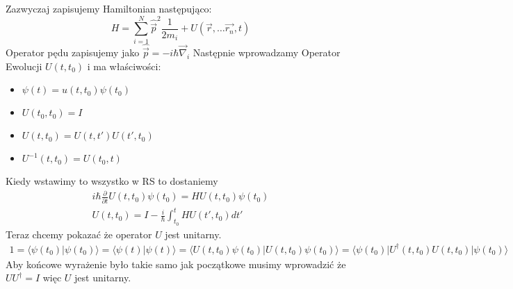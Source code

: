 Zazwyczaj zapisujemy Hamiltonian następująco:
$$  H=\sum_{i=1}^{N} \hat{\overrightarrow{p}}^{2} \frac{1}{2 m_{i}} + U\left(\vec{r}, \ldots \overrightarrow{r_{n}}, t\right)  $$
Operator pędu zapisujemy jako $\hat{\overrightarrow{p}} = -i \hbar \overrightarrow{\nabla}_i$
Następnie wprowadzamy Operator Ewolucji $U(t, t_0)$ i ma właściwości:
\begin{itemize}
	\item $  \psi(t)=u\left(t, t_{0}\right) \psi\left(t_{0}\right)  $
	\item $U(t_0, t_0) = I$
	\item $U(t, t_0) = U(t, t')U(t', t_0)$
	\item $U^{-1}(t, t_0) = U(t_0, t)$
\end{itemize}
Kiedy wstawimy to wszystko w RS to dostaniemy 
\begin{equation*}
	\begin{split}
		i \hbar \frac{\partial}{\partial t} U(t, t_0) \psi(t_0) = H U(t, t_0) \psi(t_0) \\
		U(t, t_0) = I - \frac{i}{\hbar} \int_{t_0}^t HU(t', t_0)dt'	
	\end{split}
\end{equation*}
Teraz chcemy pokazać że operator $U$ jest unitarny.
\begin{equation*}
	\begin{split}
		1=\langle\psi(t_{0}) | \psi(t_0)\rangle = \langle\psi(t) | \psi(t)\rangle = \langle U(t, t_0) \psi(t_0) | U(t, t_0) \psi(t_0) \rangle = \langle \psi(t_0) | U^{\dagger}(t, t_0) U(t, t_0)| \psi(t_0)  \rangle
	\end{split}
\end{equation*}
Aby końcowe wyrażenie było takie samo jak początkowe musimy wprowadzić że $U U^{\dagger} = I$ więc $U$ jest unitarny.

